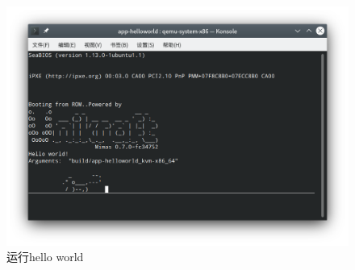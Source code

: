 \documentclass{../runikraft-report}
\begin{document}
\begin{figure}[tbh!]
\centering
\vspace*{-3ex}
\includegraphics[width=0.9\linewidth]{assets/unikraft-run}
\vspace*{-3ex}
\caption{运行hello world}
\label{fig:unikraft-run}
\end{figure}
\end{document}
